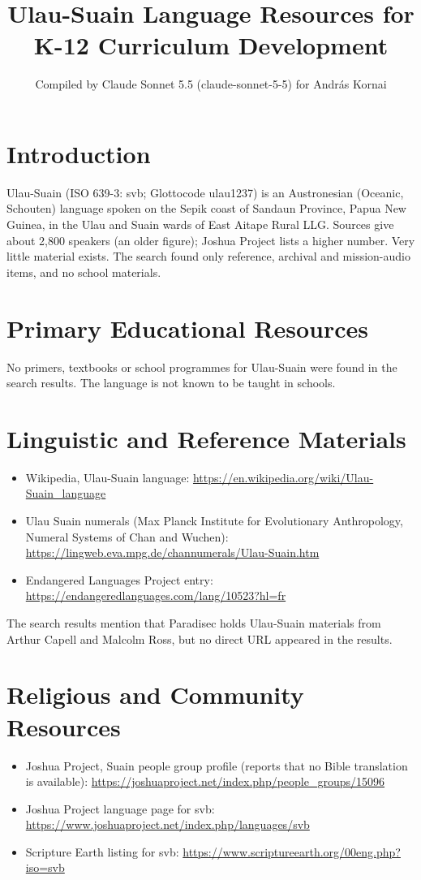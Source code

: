 \documentclass[12pt]{article}
\title{Ulau-Suain Language Resources for K-12 Curriculum Development}
\author{Compiled by Claude Sonnet 5.5 (claude-sonnet-5-5) for Andr\'as Kornai}
\date{}
\begin{document}
\maketitle

\section{Introduction}
Ulau-Suain (ISO 639-3: svb; Glottocode ulau1237) is an Austronesian (Oceanic, Schouten) language spoken on the Sepik coast of Sandaun Province, Papua New Guinea, in the Ulau and Suain wards of East Aitape Rural LLG. Sources give about 2,800 speakers (an older figure); Joshua Project lists a higher number. Very little material exists. The search found only reference, archival and mission-audio items, and no school materials.

\section{Primary Educational Resources}
No primers, textbooks or school programmes for Ulau-Suain were found in the search results. The language is not known to be taught in schools.

\section{Linguistic and Reference Materials}
\begin{itemize}
\item Wikipedia, Ulau-Suain language: \url{https://en.wikipedia.org/wiki/Ulau-Suain_language}
\item Ulau Suain numerals (Max Planck Institute for Evolutionary Anthropology, Numeral Systems of Chan and Wuchen): \url{https://lingweb.eva.mpg.de/channumerals/Ulau-Suain.htm}
\item Endangered Languages Project entry: \url{https://endangeredlanguages.com/lang/10523?hl=fr}
\end{itemize}
The search results mention that Paradisec holds Ulau-Suain materials from Arthur Capell and Malcolm Ross, but no direct URL appeared in the results.

\section{Religious and Community Resources}
\begin{itemize}
\item Joshua Project, Suain people group profile (reports that no Bible translation is available): \url{https://joshuaproject.net/index.php/people_groups/15096}
\item Joshua Project language page for svb: \url{https://www.joshuaproject.net/index.php/languages/svb}
\item Scripture Earth listing for svb: \url{https://www.scriptureearth.org/00eng.php?iso=svb}
\end{itemize}
\end{document}
